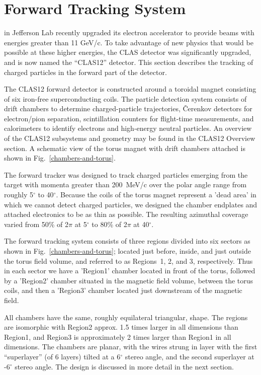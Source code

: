 \section{Forward Tracking System}
\label{overview}

 in
Jefferson Lab recently upgraded its electron accelerator to provide beams with 
energies greater than 11 GeV/c.  To take advantage of new physics that would 
be possible at these higher energies, the CLAS detector was significantly
upgraded, and is now named the ``CLAS12'' detector.  This section describes
the tracking of charged particles in the forward part of the detector.


The CLAS12 forward detector is constructed around a toroidal magnet consisting of six 
iron-free superconducting coils.  The particle detection system consists of drift 
chambers to determine charged-particle trajectories, {\v C}erenkov detectors 
for electron/pion separation, scintillation counters for flight-time 
measurements, and calorimeters to identify electrons and high-energy neutral 
particles.  An overview of the CLAS12 subsystems and geometry may be found in the 
CLAS12 Overview section.  A schematic view of the torus magnet with drift chambers
attached is shown in Fig.~\ref{chambers-and-torus}.  

The forward tracker was designed to track charged particles emerging from the target with
momenta greater than 200~MeV/c over the polar angle range from roughly 5$^{\circ}$ to 
40$^{\circ}$.  Because the coils of the torus magnet represent a 'dead area'
in which we cannot detect charged particles, we designed the chamber endplates
and attached electronics to be as thin as possible.  The resulting azimuthal
coverage varied from 50\% of 2$\pi$ at 5$^{\circ}$ to 80\% of 2$\pi$ at 40$^{\circ}$.

The forward tracking system consists of three regions divided into six
sectors as shown in Fig.~\ref{chambers-and-torus}; located just before, inside, 
and just outside the torus field volume, and referred to as Regions~1, 2, 
and 3, respectively.  Thus in each sector we have a 'Region1' chamber located
in front of the torus, followed by a 'Region2' chamber situated in the magnetic
field volume, between the torus coils, and then a 'Region3' chamber located just
downstream of the magnetic field.

All chambers have the same, roughly equilateral triangular, shape.
The regions are isomorphic with Region2 approx. 1.5 times larger
in all dimensions than Region1, and Region3 is approximately 2 times larger than Region1
in all dimensions.
The chambers are planar, with the wires strung in layer with the first ``superlayer'' (of 6 layers)
tilted at a 6$^\circ$ stereo angle, and the second superlayer at -6$^\circ$ stereo
angle.  The design is discussed in more detail in the next section.


